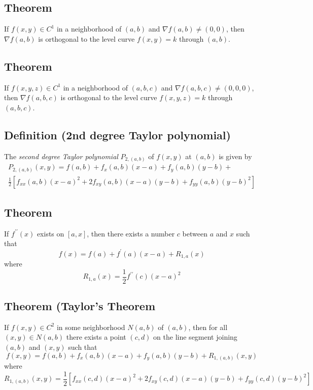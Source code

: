 \begin{thmbox}
\subsection{Theorem}
If $ f(x,y)\in C^1 $ in a neighborhood of $ (a,b) $ and
$ \nabla f(a,b)\neq (0,0) $, then $ \nabla f(a,b) $ is
orthogonal to the level curve $ f(x,y)=k $ through
$ (a,b) $.
\end{thmbox}

\begin{thmbox}
\subsection{Theorem}
If $ f(x,y,z)\in C^1 $ in a neighborhood of $ (a,b,c) $ and
$ \nabla f(a,b,c)\neq (0,0,0) $, then $ \nabla f(a,b,c) $ is
orthogonal to the level curve $ f(x,y,z)=k $ through
$ (a,b,c) $.
\end{thmbox}

\begin{defbox}
\subsection{Definition (2nd degree Taylor polynomial)}
The \emph{second degree Taylor polynomial} $ P_{2,(a,b)} $ 
of $ f(x,y) $ at $ (a,b) $ is given by
\[
\begin{aligned}
P_{2,(a,b)}(x,y)=
f(a,b)+f_x(a,b)(x-a)+f_y(a,b)(y-b)+\\
\frac{1}{2} [f_{xx}(a,b)(x-a)^2+2f_{xy}(a,b)(x-a)(y-b)+
f_{yy}(a,b)(y-b)^2]
\end{aligned}
\]
\end{defbox}

\begin{thmbox}
\subsection{Theorem}
If $ f^{\prime\prime}(x) $ exists on $ [a,x] $, then there exists
a number $ c $ between $ a $ and $ x $ such that
\[ f(x)=f(a)+f^\prime (a)(x-a)+R_{1,a}(x) \]
where
\[ R_{1,a}(x)=\frac{1}{2} f^{\prime\prime}(c)(x-a)^2 \]
\end{thmbox}

\begin{thmbox}
\subsection{Theorem (Taylor's Theorem}
If $ f(x,y)\in C^2 $ in some neighborhood $ N(a,b) $ of
$ (a,b) $, then for all $ (x,y)\in N(a,b) $ there
exists a point $ (c,d) $ on the line segment joining
$ (a,b) $ and $ (x,y) $ such that
\[ f(x,y)=f(a,b)+f_x(a,b)(x-a)+f_y(a,b)(y-b)+R_{1,(a,b)}(x,y) \]
where
\[ R_{1,(a,b)}(x,y)=\frac{1}{2}
[f_{xx}(c,d)(x-a)^2+2f_{xy}(c,d)(x-a)(y-b)+f_{yy}(c,d)(y-b)^2] \]
\end{thmbox}

